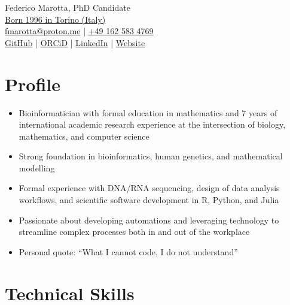 \documentclass[
	DIV=15,
]{scrartcl}
\begin{document}
\begin{center}
	{ \huge Federico Marotta, PhD Candidate}\\[10px]
	\href{https://en.wikipedia.org/wiki/Turin}{ Born 1996 in Torino (Italy)}\\[4px]
	\href{mailto:fmarotta@proton.me}{ fmarotta@proton.me}
	| \href{tel:+491625834769}{ +49 162 583 4769}\\[4px]
	\href{https://github.com/fmarotta}{ GitHub}
	| \href{https://orcid.org/0000-0002-0174-3901}{ ORCiD}
	| \href{https://www.linkedin.com/in/federico-marotta-4a6b23137/}{ LinkedIn}
	| \href{https://www.fmarotta.net}{ Website}\\[4px]
\end{center}

\section*{Profile}

\begin{itemize}
	\item Bioinformatician with formal education in mathematics and 7 years of international academic research experience at the intersection of biology, mathematics, and computer science
	\item Strong foundation in bioinformatics, human genetics, and mathematical modelling
	\item Formal experience with DNA/RNA sequencing, design of data analysis workflows, and scientific software development in R, Python, and Julia
	\item Passionate about developing automations and leveraging technology to streamline complex processes both in and out of the workplace
	\item Personal quote: \enquote{What I cannot code, I do not understand}
\end{itemize}

\section*{Technical Skills}
\end{document}
